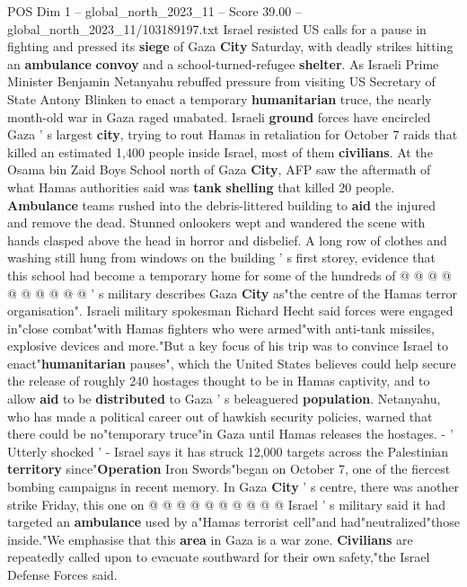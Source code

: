 \begin{textsample}{POS Dim 1 – global\_north\_2023\_11 – Score 39.00 – global\_north\_2023\_11/103189197.txt}  \label{ex:f1_pos_256}
Israel resisted US calls for a pause in fighting and pressed its \textbf{siege} of Gaza \textbf{City} Saturday, with deadly strikes hitting an \textbf{ambulance} \textbf{convoy} and a school-turned-refugee \textbf{shelter}.
As Israeli Prime Minister Benjamin Netanyahu rebuffed pressure from visiting US Secretary of State Antony Blinken to enact a temporary \textbf{humanitarian} truce, the nearly month-old war in Gaza raged unabated.
Israeli \textbf{ground} forces have encircled Gaza ' s largest \textbf{city}, trying to rout Hamas in retaliation for October 7 raids that killed an estimated 1,400 people inside Israel, most of them \textbf{civilians}.
At the Osama bin Zaid Boys School north of Gaza \textbf{City}, AFP saw the aftermath of what Hamas authorities said was \textbf{tank} \textbf{shelling} that killed 20 people. \textbf{Ambulance} teams rushed into the debris-littered building to \textbf{aid} the injured and remove the dead.
Stunned onlookers wept and wandered the scene with hands clasped above the head in horror and disbelief.
A long row of clothes and washing still hung from windows on the building ' s first storey, evidence that this school had become a temporary home for some of the hundreds of @ @ @ @ @ @ @ @ @ @ ' s military describes Gaza \textbf{City} as"the centre of the Hamas terror organisation".
Israeli military spokesman Richard Hecht said forces were engaged in"close combat"with Hamas fighters who were armed"with anti-tank missiles, explosive devices and more."But a key focus of his trip was to convince Israel to enact"\textbf{humanitarian} pauses", which the United States believes could help secure the release of roughly 240 hostages thought to be in Hamas captivity, and to allow \textbf{aid} to be \textbf{distributed} to Gaza ' s beleaguered \textbf{population}.
Netanyahu, who has made a political career out of hawkish security policies, warned that there could be no"temporary truce"in Gaza until Hamas releases the hostages. - ' Utterly shocked ' - Israel says it has struck 12,000 targets across the Palestinian \textbf{territory} since"\textbf{Operation} Iron Swords"began on October 7, one of the fiercest bombing campaigns in recent memory.
In Gaza \textbf{City} ' s centre, there was another strike Friday, this one on @ @ @ @ @ @ @ @ @ @ Israel ' s military said it had targeted an \textbf{ambulance} used by a"Hamas terrorist cell"and had"neutralized"those inside."We emphasise that this \textbf{area} in Gaza is a war zone. \textbf{Civilians} are repeatedly called upon to evacuate southward for their own safety,"the Israel Defense Forces said.

\end{textsample}
